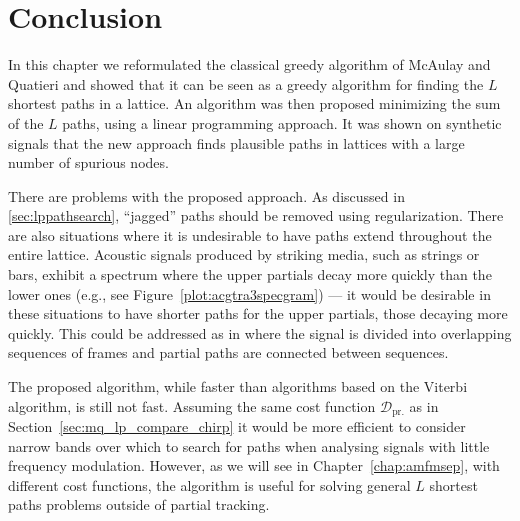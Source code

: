 \section{Conclusion}

In this chapter we reformulated the classical greedy algorithm of McAulay and
Quatieri and showed that it can be seen as a greedy algorithm for finding the $L$
shortest paths in a lattice. An algorithm was then proposed minimizing the sum
of the $L$ paths, using a linear programming approach. It was shown on synthetic
signals that the new approach finds plausible paths in lattices with a
large number of spurious nodes.

There are problems with the proposed approach. As discussed in
\ref{sec:lppathsearch}, ``jagged'' paths should be removed using regularization.
There are also situations where it is undesirable to have paths extend
throughout the entire lattice. Acoustic signals produced by striking media, such
as strings or bars, exhibit a spectrum where the upper partials decay more
quickly than the lower ones (e.g., see Figure~\ref{plot:acgtra3specgram}) --- it
would be desirable in these situations to have shorter paths for the upper
partials, those decaying more quickly. This could be addressed as in
\cite{depalle1993tracking} where the signal is divided into overlapping sequences of
frames and partial paths are connected between sequences.

The proposed algorithm, while faster than algorithms based on the Viterbi
algorithm, is still not fast. Assuming the same cost function
$\mathcal{D}_{\text{pr.}}$ as in Section~\ref{sec:mq_lp_compare_chirp} it would
be more efficient to consider narrow bands over which to search for paths when
analysing signals with little frequency modulation. However, as we will see in
Chapter~\ref{chap:amfmsep}, with different cost functions, the algorithm is
useful for solving general $L$ shortest paths problems outside of partial
tracking. 



